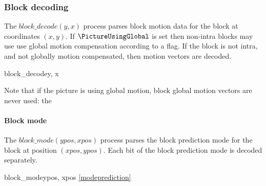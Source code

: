 \subsubsection{Block decoding}
\label{blockdecoding}

The $block\_decode(y, x)$ process parses block motion data for the block at coordinates $(x, y)$. If $\PictureUsingGlobal$ is set
then non-intra blocks may use use global motion compensation according to a flag.
If the block is not intra, and not globally motion compensated, then motion vectors are decoded.

\begin{pseudo}{block\_decode}{y, x}
\bsIF{\BlockData[y][x][mode]==\Intra}
    \bsCODE{\BlockData[y][x][global]=\false}
\bsELSE
    \bsIF{\PictureUsingGlobal==\true}
    \bsELSE
        \bsCODE{\BlockData[y][x][global]=\false}
    \bsEND

    \bsIF{\BlockData[y][x][global]=\false}
    \bsEND
\end{pseudo}

\begin{informative}
Note that if the picture is using global motion, block global motion vectors are never used: the
\end{informative}

\paragraph{Block mode \\}
\label{blockmode}

The $block\_mode(ypos,xpos)$ process parses the block prediction mode for the block at position $(xpos, ypos)$. Each
bit of the block prediction mode is decoded separately.

\begin{pseudo}{block\_mode}{ypos, xpos}
     {\ref{modeprediction}}
\bsEND
\end{pseudo}

